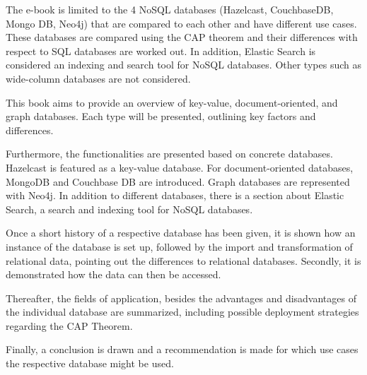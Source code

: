 The e-book is limited to the 4 \acs{NoSQL} databases (Hazelcast, CouchbaseDB, Mongo DB, Neo4j) that are compared to each other and have different use cases. These databases are compared using the \acs{CAP} theorem and their differences with respect to \ac{SQL} databases are worked out. In addition, Elastic Search is considered an indexing and search tool for \acs{NoSQL} databases. Other types such as wide-column databases are not considered.

This book aims to provide an overview of key-value, document-oriented, and graph databases. Each type will be presented, outlining key factors and differences.

Furthermore, the functionalities are presented based on concrete databases. Hazelcast is featured as a key-value database. For document-oriented databases, MongoDB and Couchbase DB are introduced. Graph databases are represented with Neo4j. In addition to different databases, there is a section about Elastic Search, a search and indexing tool for \acs{NoSQL} databases.

Once a short history of a respective database has been given, it is shown how an instance of the database is set up, followed by the import and transformation of relational data, pointing out the differences to relational databases. Secondly, it is demonstrated how the data can then be accessed.

Thereafter, the fields of application, besides the advantages and disadvantages of the individual database are summarized, including possible deployment strategies regarding the \acs{CAP} Theorem.

Finally, a conclusion is drawn and a recommendation is made for which use cases the respective database might be used.

